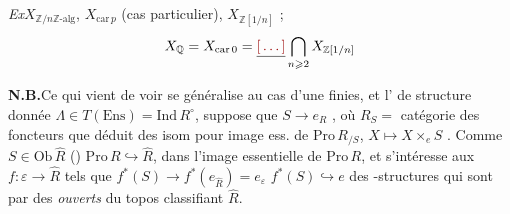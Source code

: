 \documentclass[11pt,a4paper]{article}
\begin{document}
\emph{Ex}\quad $X_{\mathbb{Z}/n\mathbb{Z}\text{-alg}}$,
$X_{\mathrm{car}\,p}$ (cas particulier), $X_{\mathbb{Z}[1/n]}$ ;
\[
  X_{\mathbb{Q}} = X_{\mathrm{car}\,0} = \struck{\ill{}}
  \bigcap_{n \geqslant 2} X_{\mathbb{Z}[1/n]}
\]

\textbf{N.B.}\quad Ce qui vient de  voir se généralise au cas d'une
\ill{} finies, et l'\ill{} de structure donnée $\Lambda \in T(\mathrm{Ens})
= \mathrm{Ind}\,R^{\circ}$, \ill{} suppose que $S \to e_{R}$ \ill{}, où
$R_{S} =$ catégorie des foncteurs \ill{} que déduit des isom pour \ill{} image
ess. de $\mathrm{Pro}\,R_{/S}$, $X \mapsto X \times_{e} S$ \struck{\ill{}}.
Comme $S \in \mathrm{Ob}\,\hat{R}$ () \ill{}
$\mathrm{Pro}\,R \hookrightarrow \hat{R}$, \struck{\ill{}} \ill{} dans
l'image essentielle de $\mathrm{Pro}\,R$, et s'intéresse aux $f :
\varepsilon \to \hat{R}$ tels que $f^{*}(S) \to f^{*}(e_{\hat{R}}) =
e_{\varepsilon}$ \ill{} \ill{} $f^{*}(S) \hookrightarrow e$ \ill{} \ill{}
des \ill{}-structures qui sont  \ill{} par des
\emph{ouverts} du topos classifiant $\hat{R}$.


\end{document}
